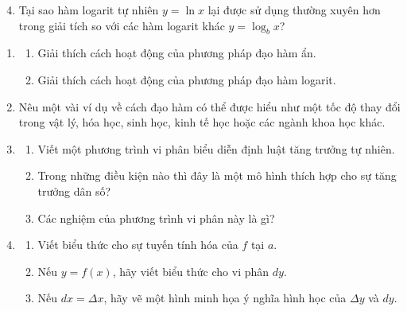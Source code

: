 \hfill
\begin{minipage}[t]{0.485\textwidth}
\begin{enumerate}[label=(\alph*), leftmargin=30pt, itemsep=1.5pt, topsep=0pt]
    \setcounter{enumii}{3}
    \item Tại sao hàm logarit tự nhiên $y = \ln x$ lại được sử dụng thường xuyên hơn trong giải tích so với các hàm logarit khác $y = \log_b x$?
\end{enumerate}
\vspace{-2pt}
\begin{enumerate}[label=\textbf{\arabic*.}, leftmargin=14pt, itemsep=4.5pt, topsep=1.5pt, start=4]
    \item 
    \begin{enumerate}[label=(\alph*), leftmargin=16pt, itemsep=1.5pt, topsep=1.5pt]
        \item Giải thích cách hoạt động của phương pháp đạo hàm ẩn.
        \item Giải thích cách hoạt động của phương pháp đạo hàm logarit.
    \end{enumerate}

    \item Nêu một vài ví dụ về cách đạo hàm có thể được hiểu như một tốc độ thay đổi trong vật lý, hóa học, sinh học, kinh tế học hoặc các ngành khoa học khác.

    \item 
    \begin{enumerate}[label=(\alph*), leftmargin=16pt, itemsep=1.5pt, topsep=1.5pt]
        \item Viết một phương trình vi phân biểu diễn định luật tăng trưởng tự nhiên.
        \item Trong những điều kiện nào thì đây là một mô hình thích hợp cho sự tăng trưởng dân số?
        \item Các nghiệm của phương trình vi phân này là gì?
    \end{enumerate}

    \item 
    \begin{enumerate}[label=(\alph*), leftmargin=16pt, itemsep=1.5pt, topsep=1.5pt]
        \item Viết biểu thức cho sự tuyến tính hóa của $f$ tại $a$.
        \item Nếu $y = f(x)$, hãy viết biểu thức cho vi phân $dy$.
        \item Nếu $dx = \Delta x$, hãy vẽ một hình minh họa ý nghĩa hình học của $\Delta y$ và $dy$.
    \end{enumerate}
\end{enumerate}
\end{minipage}

